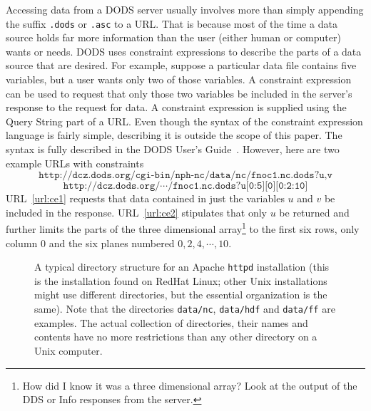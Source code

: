 \documentclass{article}
\begin{document}
Accessing data from a DODS server usually involves more than simply appending
the suffix \texttt{.dods} or \texttt{.asc} to a URL. That is because most of
the time a data source holds far more information than the user (either human
or computer) wants or needs. DODS uses constraint expressions
 to describe the parts of a data source that are
desired. For example, suppose a particular data file contains five variables,
but a user wants only two of those variables. A constraint expression can be
used to request that only those two variables be included in the server's
response to the request for data. A constraint expression is supplied using
the Query String  part of a URL. Even though the
syntax of the constraint expression language is fairly simple, describing it
is outside the scope of this paper. The syntax is fully described in the DODS
User's Guide~\cite{DODS:users-guide}. However, here are two example URLs with
constraints
\begin{equation}
\texttt{http://dcz.dods.org/cgi-bin/nph-nc/data/nc/fnoc1.nc.dods?u,v}
\label{url:ce1}
\end{equation}
\begin{equation}
\texttt{http://dcz.dods.org/} \cdots \texttt{/fnoc1.nc.dods?u[0:5][0][0:2:10]}
\label{url:ce2}
\end{equation}
URL~\ref{url:ce1} requests that data contained in just the variables $u$ and
$v$ be included in the response. URL~\ref{url:ce2} stipulates that only $u$
be returned and further limits the parts of the three dimensional
array\footnote{How did I know it was a three dimensional array? Look at the
  output of the DDS or Info responses from the server.} to the first six
rows, only column $0$ and the six planes numbered $0, 2, 4, \cdots, 10$.

\begin{figure}[h]
\begin{center}
\caption{A typical directory structure for an Apache \texttt{httpd}
  installation (this is the installation found on RedHat Linux; other Unix
  installations might use different directories, but the essential
  organization is the same). Note that the directories \texttt{data/nc},
  \texttt{data/hdf} and \texttt{data/ff} are examples. The actual collection
  of directories, their names and contents have no more restrictions than any
  other directory on a Unix computer.}
\label{fig:httpd-directories}
\end{center}
\end{figure}
\end{document}
